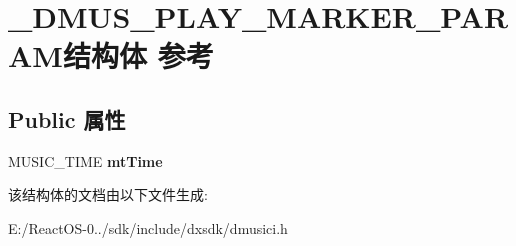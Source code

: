 \hypertarget{struct___d_m_u_s___p_l_a_y___m_a_r_k_e_r___p_a_r_a_m}{}\section{\+\_\+\+D\+M\+U\+S\+\_\+\+P\+L\+A\+Y\+\_\+\+M\+A\+R\+K\+E\+R\+\_\+\+P\+A\+R\+A\+M结构体 参考}
\label{struct___d_m_u_s___p_l_a_y___m_a_r_k_e_r___p_a_r_a_m}
\subsection*{Public 属性}
\begin{DoxyCompactItemize}
\item 
\mbox{\label{struct___d_m_u_s___p_l_a_y___m_a_r_k_e_r___p_a_r_a_m_a47a7552d0876eec3c0a0c14a103e1491}} 
M\+U\+S\+I\+C\+\_\+\+T\+I\+ME {\bfseries mt\+Time}
\end{DoxyCompactItemize}


该结构体的文档由以下文件生成\+:\begin{DoxyCompactItemize}
\item 
E\+:/\+React\+O\+S-\/0../sdk/include/dxsdk/dmusici.\+h\end{DoxyCompactItemize}
